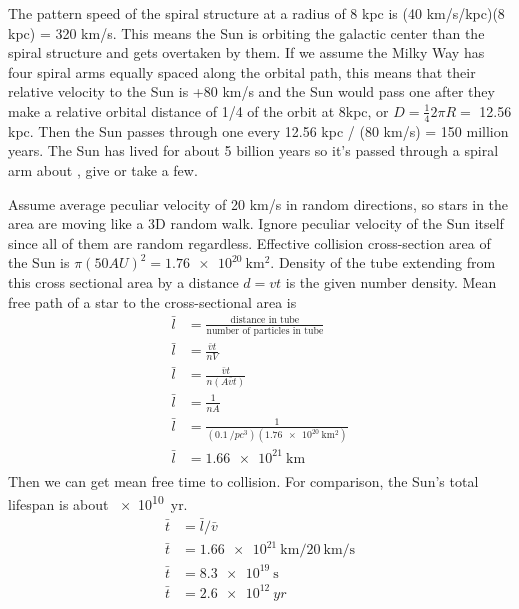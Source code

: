 \documentclass{homework}
\begin{document}
\maketitle


\question
The pattern speed of the spiral structure at a radius of 8 kpc is (40 km/s/kpc)(8 kpc) = 320 km/s. This means the Sun is orbiting the galactic center  than the spiral structure and gets overtaken by them. If we assume the Milky Way has four spiral arms equally spaced along the orbital path, this means that their relative velocity to the Sun is +80 km/s and the Sun would pass one after they make a relative orbital distance of 1/4 of the orbit at 8kpc, or $D = \frac{1}{4} 2\pi R = $ 12.56 kpc. Then the Sun passes through one every 12.56 kpc / (80 km/s) = 150 million years. The Sun has lived for about 5 billion years so it's passed through a spiral arm about , give or take a few.


\question
Assume average peculiar velocity of 20 km/s in random directions, so stars in the area are moving like a 3D random walk. Ignore peculiar velocity of the Sun itself since all of them are random regardless. Effective collision cross-section area of the Sun is $\pi(50 AU)^2 = \SI{1.76e20}{\kilo\metre^2}$. Density of the tube extending from this cross sectional area by a distance $d = vt$ is the given number density. Mean free path of a star to the cross-sectional area is
\begin{align*}
    \bar{l}	&=	\frac{\text{distance in tube}}{\text{number of particles in tube}}	\\
    \bar{l}	&=	\frac{\bar{v}t}{nV}	\\
    \bar{l}	&=	\frac{\bar{v}t}{n(A\bar{v}t)}	\\
    \bar{l}	&=	\frac{1}{nA}	\\
    \bar{l}	&=	\frac{1}{(\SI{0.1}{\per pc^3})(\SI{1.76e20}{\kilo\metre^2})}	\\
    \bar{l}	&=	\SI{1.66e21}{\kilo\metre}	\\
\end{align*}
Then we can get mean free time to collision. For comparison, the Sun's total lifespan is about \SI{e10}{yr}.
\begin{align*}
    \bar{t}	&=	\bar{l}/\bar{v}	\\
    \bar{t}	&=	\SI{1.66e21}{\kilo\metre}/\SI{20}{\kilo\metre\per\second}	\\
    \bar{t}	&=	\SI{8.3e19}{\second}	\\
    \bar{t}	&=	\boxed{\SI{2.6e12}{yr}}	\\
\end{align*}
\end{document}
